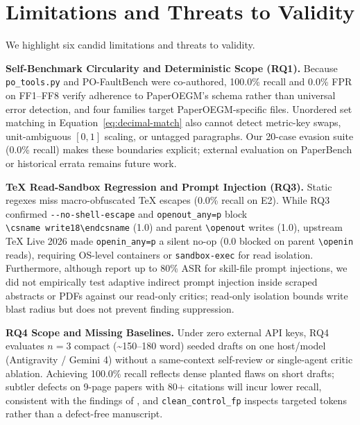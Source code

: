 \section{Limitations and Threats to Validity}\label{sec:limitations}

We highlight six candid limitations and threats to validity.

\textbf{Self-Benchmark Circularity and Deterministic Scope (RQ1).} Because \texttt{po\_\allowbreak{}tools.\allowbreak{}py} and PO-FaultBench were co-authored, 100.0\% recall and 0.0\% FPR on FF1--FF8 verify adherence to PaperOEGM's schema rather than universal error detection, and four families target PaperOEGM-specific files. Unordered set matching in Equation~\eqref{eq:decimal-match} also cannot detect metric-key swaps, unit-ambiguous \([0, 1]\) scaling, or untagged paragraphs. Our 20-case evasion suite (0.0\% recall) makes these boundaries explicit; external evaluation on PaperBench \citep{starace2025paperbench} or historical errata remains future work.

\textbf{TeX Read-Sandbox Regression and Prompt Injection (RQ3).} Static regexes miss macro-obfuscated TeX escapes (0.0\% recall on E2). While RQ3 confirmed \texttt{\mbox{-{}-}no-\allowbreak{}shell-escape} and \texttt{openout\_\allowbreak{}any=p} block \texttt{\textbackslash{}csname\ write18\textbackslash{}endcsname} (1.0) and parent \texttt{\textbackslash{}openout} writes (1.0), upstream TeX Live 2026 made \texttt{openin\_\allowbreak{}any=p} a silent no-op (0.0 blocked on parent \texttt{\textbackslash{}openin} reads), requiring OS-level containers or \texttt{sandbox-exec} for read isolation. Furthermore, although \citet{schmotz2026skillinject} report up to 80\% ASR for skill-file prompt injections, we did not empirically test adaptive indirect prompt injection inside scraped abstracts or PDFs against our read-only critics; read-only isolation bounds write blast radius but does not prevent finding suppression.

\textbf{RQ4 Scope and Missing Baselines.} Under zero external API keys, RQ4 evaluates \(n=3\) compact (\textasciitilde150--180 word) seeded drafts on one host/model (Antigravity / Gemini 4) without a same-context self-review or single-agent critic ablation. Achieving 100.0\% recall reflects dense planted flaws on short drafts; subtler defects on 9-page papers with 80+ citations will incur lower recall, consistent with the findings of \citet{liang2024feedback}, and \texttt{clean\_\allowbreak{}control\_\allowbreak{}fp} inspects targeted tokens rather than a defect-free manuscript.

